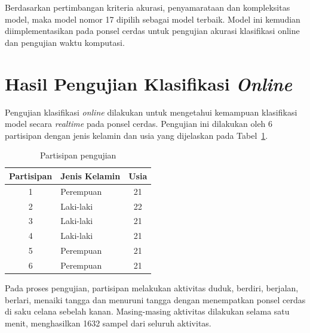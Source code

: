 Berdasarkan pertimbangan kriteria akurasi, penyamarataan dan kompleksitas model, maka model nomor 17 dipilih sebagai model terbaik. Model ini kemudian diimplementasikan pada ponsel cerdas untuk pengujian akurasi klasifikasi online dan pengujian waktu komputasi.

\section{Hasil Pengujian Klasifikasi \textit{Online}}

Pengujian klasifikasi \textit{online} dilakukan untuk mengetahui kemampuan klasifikasi model secara \textit{realtime} pada ponsel cerdas. Pengujian ini dilakukan oleh 6 partisipan dengan jenis kelamin dan usia yang dijelaskan pada Tabel~\ref{table:partisipan}.

\begin{table}[h!]
    \centering
    \caption{Partisipan pengujian}
    \begin{tabular}{ |c|l|c| }
        \hline
        Partisipan & Jenis Kelamin & Usia \\

        \hline
        1 & Perempuan & 21 \\

        \hline
        2 & Laki-laki & 22 \\

        \hline
        3 & Laki-laki & 21 \\

        \hline
        4 & Laki-laki & 21 \\

        \hline
        5 & Perempuan & 21 \\

        \hline
        6 & Perempuan & 21 \\

        \hline
    \end{tabular}
    \label{table:partisipan}
\end{table}

Pada proses pengujian, partisipan melakukan aktivitas duduk, berdiri, berjalan, berlari, menaiki tangga dan menuruni tangga dengan menempatkan ponsel cerdas di saku celana sebelah kanan. Masing-masing aktivitas dilakukan selama satu menit, menghasilkan 1632 sampel dari seluruh aktivitas.

